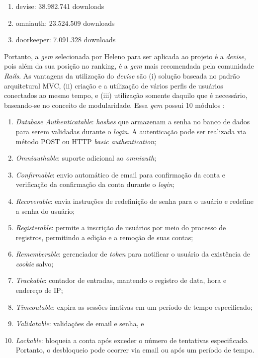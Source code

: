 \begin{enumerate}
	\item devise: 38.982.741 downloads
	\item omniauth: 23.524.509 downloads
	\item doorkeeper: 7.091.328 downloads
\end{enumerate}

Portanto, a \textit{gem} selecionada por Heleno para ser aplicada ao projeto é a \textit{devise}, pois além da sua posição no ranking, é a \textit{gem} mais recomendada pela comunidade \textit{Rails}. As vantagens da utilização do \textit{devise} são  (i) solução baseada no padrão arquitetural MVC, (ii) criação e a utilização de vários perfis de usuários conectados ao mesmo tempo, e (iii) utilização somente daquilo que é necessário, baseando-se no conceito de modularidade. Essa \textit{gem} possui 10 módulos \cite{gemdevise}: 

\begin{enumerate}
	\item \textit{Database Authenticatable}: \textit{hashes} que armazenam a senha no banco de dados para serem validadas durante o \textit{login}. A autenticação pode ser realizada via método POST ou HTTP \textit{basic authentication}; 
	
	\item \textit{Omniauthable}: suporte adicional ao \textit{omniauth};
	
	\item \textit{Confirmable}: envio automático de email para confirmação da conta e verificação da confirmação da conta durante o \textit{login};
	
	\item \textit{Recoverable}: envia instruções de redefinição de senha para o usuário e redefine a senha do usuário;
	
	\item \textit{Registerable}: permite a inscrição de usuários por meio do processo de registros, permitindo a edição e a remoção de suas contas;
	
	\item \textit{Rememberable}: gerenciador de \textit{token} para notificar o usuário da existência de \textit{cookie} salvo;
	
	\item \textit{Trackable}: contador de entradas, mantendo o registro de data, hora e endereço de IP;
	
	\item \textit{Timeoutable}: expira as sessões inativas em um período de tempo especificado;
	
	\item \textit{Validatable}: validações de email e senha, e
	 
	\item \textit{Lockable}: bloqueia a conta após exceder o número de tentativas especificado. Portanto, o desbloqueio pode ocorrer via email ou após um período de tempo. 
\end{enumerate}

